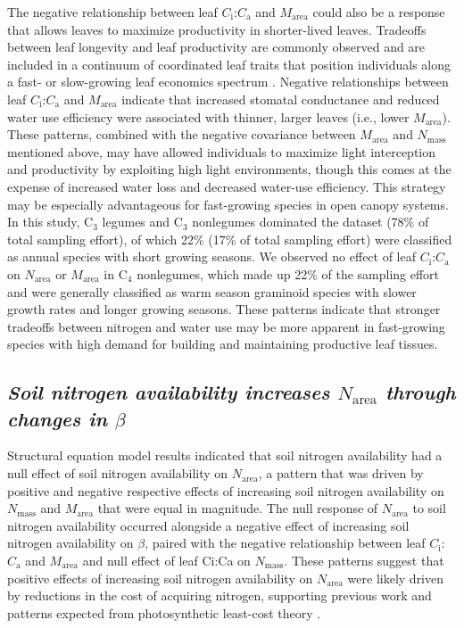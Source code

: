 The negative relationship between leaf $C_\mathrm{i}$:$C_\mathrm{a}$ and $M_\mathrm{area}$ could also be a response that allows leaves to maximize productivity in shorter-lived leaves. Tradeoffs between leaf longevity and leaf productivity are commonly observed and are included in a continuum of coordinated leaf traits that position individuals along a fast- or slow-growing leaf economics spectrum . Negative relationships between leaf $C_\mathrm{i}$:$C_\mathrm{a}$ and $M_\mathrm{area}$ indicate that increased stomatal conductance and reduced water use efficiency were associated with thinner, larger leaves (i.e., lower $M_\mathrm{area}$). These patterns, combined with the negative covariance between $M_\mathrm{area}$ and $N_\mathrm{mass}$ mentioned above, may have allowed individuals to maximize light interception and productivity by exploiting high light environments, though this comes at the expense of increased water loss and decreased water-use efficiency. This strategy may be especially advantageous for fast-growing species in open canopy systems. In this study, C$_3$ legumes and C$_3$ nonlegumes dominated the dataset (78\% of total sampling effort), of which 22\% (17\% of total sampling effort) were classified as annual species with short growing seasons. We observed no effect of leaf $C_\mathrm{i}$:$C_\mathrm{a}$ on $N_\mathrm{area}$ or $M_\mathrm{area}$ in C$_4$ nonlegumes, which made up 22\% of the sampling effort and were generally classified as warm season graminoid species with slower growth rates and longer growing seasons. These patterns indicate that stronger tradeoffs between nitrogen and water use may be more apparent in fast-growing species with high demand for building and maintaining productive leaf tissues.

\begin{singlespace}
\subsection{\textit{Soil nitrogen availability increases $N_\mathrm{area}$ through changes in $\beta$}}
\end{singlespace}
\noindent Structural equation model results indicated that soil nitrogen availability had a null effect of soil nitrogen availability on $N_\mathrm{area}$, a pattern that was driven by positive and negative respective effects of increasing soil nitrogen availability on $N_\mathrm{mass}$ and $M_\mathrm{area}$ that were equal in magnitude. The null response of $N_\mathrm{area}$ to soil nitrogen availability occurred alongside a negative effect of increasing soil nitrogen availability on $\beta$, paired with the negative relationship between leaf $C_\mathrm{i}$:$C_\mathrm{a}$ and $M_\mathrm{area}$ and null effect of leaf Ci:Ca on $N_\mathrm{mass}$. These patterns suggest that positive effects of increasing soil nitrogen availability on $N_\mathrm{area}$ were likely driven by reductions in the cost of acquiring nitrogen, supporting previous work  and patterns expected from photosynthetic least-cost theory .

